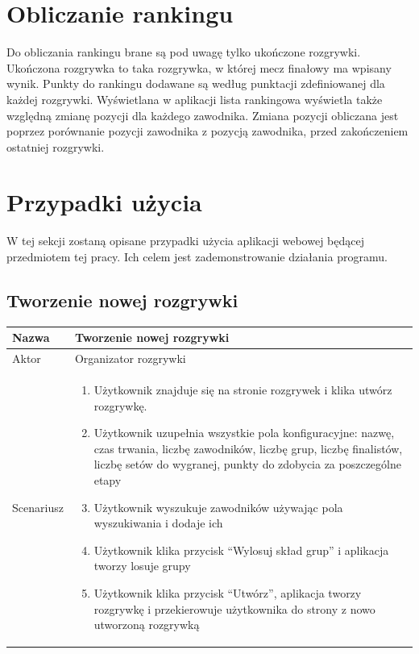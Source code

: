 \documentclass[shortabstract]{iithesis}
\begin{document}
\section{Obliczanie rankingu}
Do obliczania rankingu brane są pod uwagę tylko ukończone rozgrywki.
Ukończona rozgrywka to taka rozgrywka, w której mecz finałowy ma wpisany wynik.
Punkty do rankingu dodawane są według punktacji zdefiniowanej dla każdej rozgrywki.
Wyświetlana w aplikacji lista rankingowa wyświetla także względną zmianę pozycji dla każdego zawodnika.
Zmiana pozycji obliczana jest poprzez porównanie pozycji zawodnika z pozycją zawodnika, przed zakończeniem ostatniej rozgrywki.



\section{Przypadki użycia}
W tej sekcji zostaną opisane przypadki użycia aplikacji webowej będącej przedmiotem tej pracy.
Ich celem jest zademonstrowanie działania programu.
\subsection{Tworzenie nowej rozgrywki}
\begin{tabular}{|l|p{12cm}|}
    \hline
    Nazwa      & Tworzenie nowej rozgrywki                                                                                                                                                              \\
    \hline
    Aktor      & Organizator rozgrywki                                                                                                                                                                  \\
    \hline
    Scenariusz &
    \begin{enumerate}[nosep,leftmargin=*,rightmargin=8pt,before=\vspace{-7.5pt},after=\vspace{-8pt}]
        \item Użytkownik znajduje się na stronie rozgrywek i klika utwórz rozgrywkę.
        \item Użytkownik uzupełnia wszystkie pola konfiguracyjne: nazwę, czas trwania, liczbę zawodników, liczbę grup, liczbę finalistów, liczbę setów do wygranej, punkty do zdobycia za poszczególne etapy
        \item Użytkownik wyszukuje zawodników używając pola wyszukiwania i dodaje ich
        \item Użytkownik klika przycisk ``Wylosuj skład grup'' i aplikacja tworzy losuje grupy
        \item Użytkownik klika przycisk ``Utwórz'', aplikacja tworzy rozgrywkę i przekierowuje użytkownika do strony z nowo utworzoną rozgrywką
    \end{enumerate} \\
    \hline
\end{tabular}
\end{document}
